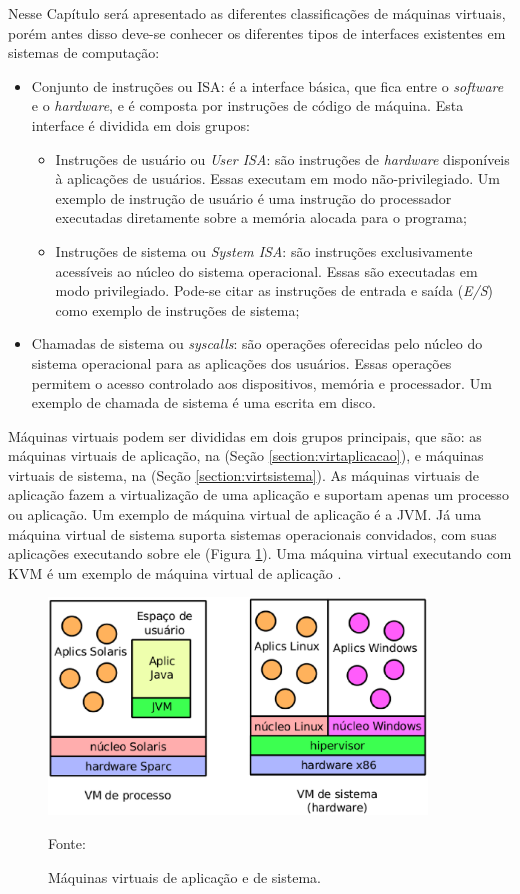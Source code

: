 Nesse Capítulo será apresentado as diferentes classificações de máquinas virtuais, porém antes disso deve-se conhecer os diferentes 
tipos de interfaces existentes em sistemas de computação:
\begin{itemize}
 \item Conjunto de instruções ou \ac{ISA}: é a interface básica, que fica entre o \textit{software} e o \textit{hardware}, e é composta por 
 instruções de código de máquina. Esta interface é dividida em dois grupos:
 \begin{itemize}
  \item Instruções de usuário ou \textit{User \ac{ISA}}: são instruções de \textit{hardware} disponíveis à aplicações de usuários. Essas 
  executam em modo não-privilegiado. Um exemplo de instrução de usuário é uma instrução do processador executadas diretamente sobre a memória
  alocada para o programa;
  \item Instruções de sistema ou \textit{System \ac{ISA}}: são instruções exclusivamente acessíveis ao núcleo do sistema operacional. 
  Essas são executadas em modo privilegiado. Pode-se citar as instruções de entrada e saída (\textit{E/S}) como exemplo de instruções de sistema;
 \end{itemize}
 \item Chamadas de sistema ou \textit{syscalls}: são operações oferecidas pelo núcleo do sistema operacional para as aplicações dos usuários.
 Essas operações permitem o acesso controlado aos dispositivos, memória e processador. Um exemplo de chamada de sistema é uma escrita em disco.
\end{itemize}

Máquinas virtuais podem ser divididas em dois grupos principais, que são: as máquinas virtuais de aplicação, na (Seção \ref{section:virtaplicacao}), 
e máquinas virtuais de sistema, na (Seção \ref{section:virtsistema}). As máquinas virtuais de aplicação fazem a virtualização de uma 
aplicação e suportam apenas um processo ou aplicação. Um exemplo de máquina virtual de aplicação é a \ac{JVM}. Já uma máquina virtual de 
sistema suporta sistemas operacionais convidados, com suas aplicações executando sobre ele (Figura \ref{fig:vms_tipos}). Uma máquina virtual 
executando com \ac{KVM} é um exemplo de máquina virtual de aplicação \cite{laureano2008}.

\begin{figure}[vms_tipos]
 \centering
 \includegraphics[width=380px]{img/vms_tipos.eps}
 \caption{Máquinas virtuais de aplicação e de sistema.}
 \label{fig:vms_tipos}
 Fonte: \citet{laureano2008}
\end{figure}

